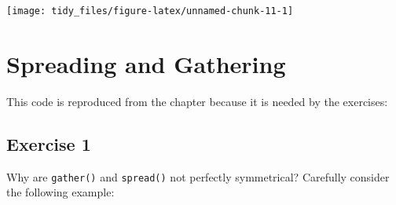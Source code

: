 \documentclass[]{book}
\newenvironment{Shaded}{\begin{snugshade}}{\end{snugshade}}
\newcommand{\DataTypeTok}[1]{\textcolor[rgb]{0.13,0.29,0.53}{#1}}
\newcommand{\KeywordTok}[1]{\textcolor[rgb]{0.13,0.29,0.53}{\textbf{#1}}}
\newcommand{\NormalTok}[1]{#1}
\newcommand{\OperatorTok}[1]{\textcolor[rgb]{0.81,0.36,0.00}{\textbf{#1}}}
\newcommand{\StringTok}[1]{\textcolor[rgb]{0.31,0.60,0.02}{#1}}
\theoremstyle{definition}
\theoremstyle{definition}
\theoremstyle{definition}
\theoremstyle{remark}
\begin{document}
\begin{center}\texttt{[image: tidy\_files/figure-latex/unnamed-chunk-11-1]} \end{center}

\hypertarget{spreading-and-gathering}{%
\section{Spreading and Gathering}\label{spreading-and-gathering}}

This code is reproduced from the chapter because it is needed by the
exercises:

\begin{Shaded}
\end{Shaded}

\hypertarget{exercise-1-17}{%
\subsection{Exercise 1}\label{exercise-1-17}}

Why are \texttt{gather()} and \texttt{spread()} not perfectly
symmetrical? Carefully consider the following example:
\end{document}
